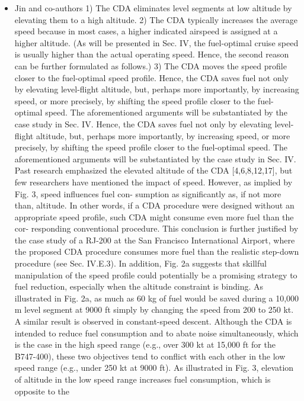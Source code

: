\documentclass{aer1315-pretty}
\begin{document}
\begin{itemize}
\item Jin and co-authors \cite{Jin:2013} 
   1) The CDA eliminates level segments at low altitude by elevating
them to a high altitude.
   2) The CDA typically increases the average speed because in most
cases, a higher indicated airspeed is assigned at a higher altitude. (As
will be presented in Sec. IV, the fuel-optimal cruise speed is usually
higher than the actual operating speed. Hence, the second reason can
be further formulated as follows.)
   3) The CDA moves the speed profile closer to the fuel-optimal
speed profile.
   Hence, the CDA saves fuel not only by elevating level-flight
altitude, but, perhaps more importantly, by increasing speed, or more
precisely, by shifting the speed profile closer to the fuel-optimal
speed. The aforementioned arguments will be substantiated by the
case study in Sec. IV.
   Hence, the CDA saves fuel not only by elevating level-flight
altitude, but, perhaps more importantly, by increasing speed, or more
precisely, by shifting the speed profile closer to the fuel-optimal
speed. The aforementioned arguments will be substantiated by the
case study in Sec. IV.
   Past research emphasized the elevated altitude of the CDA
[4,6,8,12,17], but few researchers have mentioned the impact of
speed. However, as implied by Fig. 3, speed influences fuel con-
sumption as significantly as, if not more than, altitude. In other words,
if a CDA procedure were designed without an appropriate speed
profile, such CDA might consume even more fuel than the cor-
responding conventional procedure. This conclusion is further
justified by the case study of a RJ-200 at the San Francisco
International Airport, where the proposed CDA procedure consumes
more fuel than the realistic step-down procedure (see Sec. IV.E.3).
   In addition, Fig. 2a suggests that skillful manipulation of the speed
profile could potentially be a promising strategy to fuel reduction,
especially when the altitude constraint is binding. As illustrated in
Fig. 2a, as much as 60 kg of fuel would be saved during a 10,000 m
level segment at 9000 ft simply by changing the speed from 200 to
250 kt. A similar result is observed in constant-speed descent.
   Although the CDA is intended to reduce fuel consumption and to
abate noise simultaneously, which is the case in the high speed range
(e.g., over 300 kt at 15,000 ft for the B747-400), these two objectives
tend to conflict with each other in the low speed range (e.g., under
250 kt at 9000 ft). As illustrated in Fig. 3, elevation of altitude in the
low speed range increases fuel consumption, which is opposite to the

\end{itemize}
\end{document}
